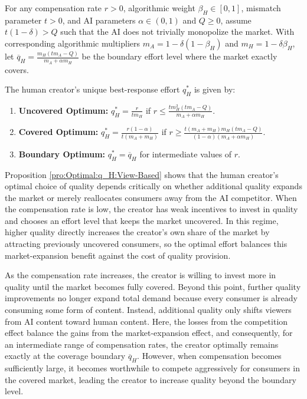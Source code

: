 \begin{proposition}\label{pro:Optimal:q_H:View-Based}
For any compensation rate $r>0$, algorithmic weight $\beta_H \in [0,1]$, mismatch parameter $t>0$, and AI parameters $\alpha \in (0,1)$ and $Q \ge 0$, assume $t(1-\delta)>Q$ such that the AI does not trivially monopolize the market. With corresponding algorithmic multipliers $m_A = 1-\delta(1-\beta_H)$ and $m_H = 1-\delta\beta_H$, let $\overline{q}_H = \frac{m_H(t m_A - Q)}{m_A + \alpha m_H}$ be the boundary effort level where the market exactly covers. 

The human creator's unique best-response effort $q_H^*$ is given by:
\begin{enumerate}
    \item \textbf{Uncovered Optimum:} $q_H^* = \frac{r}{t m_H}$ if $r \le \frac{t m_H^2 (t m_A - Q)}{m_A + \alpha m_H}$.
    \item \textbf{Covered Optimum:} $q_H^* = \frac{r(1-\alpha)}{t(m_A + m_H)}$ if $r \ge \frac{t(m_A + m_H)m_H(t m_A - Q)}{(1-\alpha)(m_A + \alpha m_H)}$.
    \item \textbf{Boundary Optimum:} $q_H^* = \overline{q}_H$ for intermediate values of $r$.
\end{enumerate}
\end{proposition}
Proposition \ref{pro:Optimal:q_H:View-Based} shows that the human creator's optimal choice of quality depends critically on whether additional quality expands the market or merely reallocates consumers away from the AI competitor. When the compensation rate is low, the creator has weak incentives to invest in quality and chooses an effort level that keeps the market uncovered. In this regime, higher quality directly increases the creator's own share of the market by attracting previously uncovered consumers, so the optimal effort balances this market-expansion benefit against the cost of quality provision.

As the compensation rate increases, the creator is willing to invest more in quality until the market becomes fully covered. Beyond this point, further quality improvements no longer expand total demand because every consumer is already consuming some form of content. Instead, additional quality only shifts viewers from AI content toward human content. Here, the losses from the competition effect balance the gains from the market-expansion effect, and consequently, for an intermediate range of compensation rates, the creator optimally remains exactly at the coverage boundary $\overline{q}_H$. However, when compensation becomes sufficiently large, it becomes worthwhile to compete aggressively for consumers in the covered market, leading the creator to increase quality beyond the boundary level.

